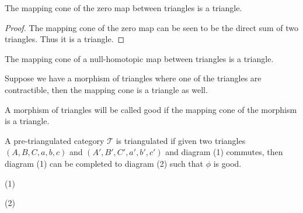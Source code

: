     \begin{corollary}
        The mapping cone of the zero map between  triangles is a triangle. 
    \end{corollary}

    \begin{proof}
        The mapping cone of the zero map can be seen to be the direct sum of two triangles. Thus it is a triangle.
    \end{proof}

    \begin{corollary}
        The mapping cone of a null-homotopic map between triangles is a triangle.
    \end{corollary}

    \begin{remark}
        Suppose we have a morphism of triangles where one of the triangles are contractible, then the mapping cone is a triangle as well.
    \end{remark}


    \begin{definition}
        A morphism of triangles will be called good if the mapping cone of the morphism is a triangle.
    \end{definition}

    \begin{theorem}
        A pre-triangulated category $\mathcal{T}$ is triangulated if given two triangles $(A,B,C,a,b,c)$ and $(A',B',C',a',b',c')$ and diagram (1) commutes, then diagram (1) can be completed to diagram (2) such that $\phi$ is good.
        \begin{center}
            (1)
            (2)
        \end{center}
    \end{theorem}

